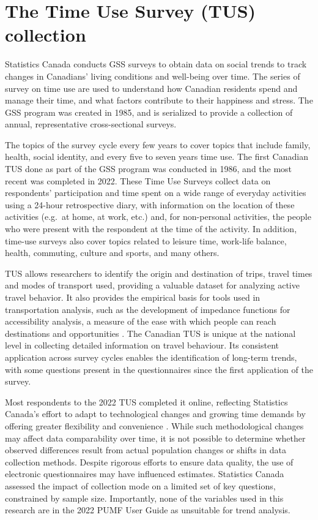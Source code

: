 \documentclass[Royal,times,sageh]{sagej}
\begin{document}
\section{The Time Use Survey (TUS)
collection}\label{the-time-use-survey-tus-collection}

Statistics Canada \citeyearpar{statisticscanada2024} conducts GSS
surveys to obtain data on social trends to track changes in Canadians'
living conditions and well-being over time. The series of survey on time
use are used to understand how Canadian residents spend and manage their
time, and what factors contribute to their happiness and stress. The GSS
program was created in 1985, and is serialized to provide a collection
of annual, representative cross-sectional surveys.

The topics of the survey cycle every few years to cover topics that
include family, health, social identity, and every five to seven years
time use. The first Canadian TUS done as part of the GSS program was
conducted in 1986, and the most recent was completed in 2022. These Time
Use Surveys \citep{statisticscanada2022} collect data on respondents'
participation and time spent on a wide range of everyday activities
using a 24-hour retrospective diary, with information on the location of
these activities (e.g.~at home, at work, etc.) and, for non-personal
activities, the people who were present with the respondent at the time
of the activity. In addition, time-use surveys also cover topics related
to leisure time, work-life balance, health, commuting, culture and
sports, and many others.

TUS allows researchers to identify the origin and destination of trips,
travel times and modes of transport used, providing a valuable dataset
for analyzing active travel behavior. It also provides the empirical
basis for tools used in transportation analysis, such as the development
of impedance functions for accessibility analysis, a measure of the ease
with which people can reach destinations and opportunities
\citep{hansen1959}. The Canadian TUS is unique at the national level in
collecting detailed information on travel behaviour. Its consistent
application across survey cycles enables the identification of long-term
trends, with some questions present in the questionnaires since the
first application of the survey.

Most respondents to the 2022 TUS completed it online, reflecting
Statistics Canada's effort to adapt to technological changes and growing
time demands by offering greater flexibility and convenience
\citep{statisticscanada2022}. While such methodological changes may
affect data comparability over time, it is not possible to determine
whether observed differences result from actual population changes or
shifts in data collection methods. Despite rigorous efforts to ensure
data quality, the use of electronic questionnaires may have influenced
estimates. Statistics Canada assessed the impact of collection mode on a
limited set of key questions, constrained by sample size. Importantly,
none of the variables used in this research are in the 2022 PUMF User
Guide as unsuitable for trend analysis.
\end{document}
